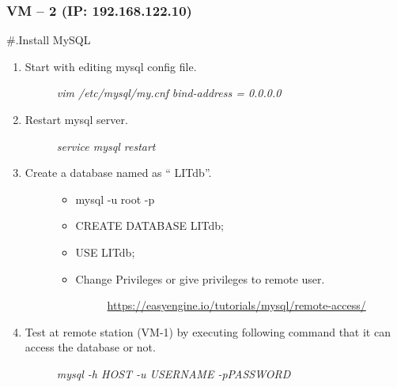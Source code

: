 \documentclass[letterpaper,10pt,english]{sphinxmanual}
\begin{document}
\subsubsection{VM – 2 (IP: 192.168.122.10)}
\label{week-13:vm-2-ip-192-168-122-10}
\#.Install MySQL
\begin{enumerate}
\item {} \begin{description}
\item[{Start with editing mysql config file.}] \leavevmode
\emph{vim /etc/mysql/my.cnf}
\emph{bind-address           = 0.0.0.0}

\end{description}

\item {} \begin{description}
\item[{Restart mysql server.}] \leavevmode
\emph{service mysql restart}

\end{description}

\item {} \begin{description}
\item[{Create a database named as “ LITdb”.}] \leavevmode\begin{itemize}
\item {} 
mysql -u root -p

\item {} 
CREATE DATABASE LITdb;

\item {} 
USE LITdb;

\item {} \begin{description}
\item[{Change Privileges or give privileges to remote user.}] \leavevmode
\href{https://easyengine.io/tutorials/mysql/remote-access/}{https://easyengine.io/tutorials/mysql/remote-access/}

\end{description}

\end{itemize}

\end{description}

\item {} \begin{description}
\item[{Test at remote station (VM-1) by executing following command that it can access the database         or not.}] \leavevmode
\emph{mysql -h HOST -u USERNAME -pPASSWORD}

\end{description}

\end{enumerate}
\end{document}
